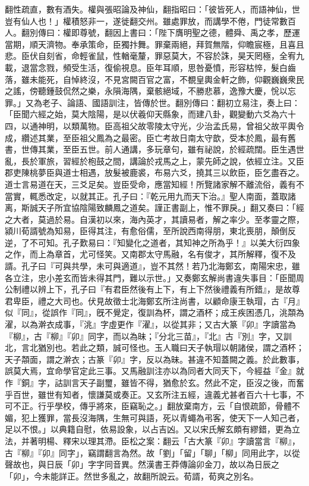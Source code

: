 \begin{pinyinscope}
翻性疏直，數有酒失。權與張昭論及神仙，翻指昭曰：「彼皆死人，而語神仙，世豈有仙人也！」權積怒非一，遂徙翻交州。雖處罪放，而講學不倦，門徒常數百人。翻別傳曰：權即尊號，翻因上書曰：「陛下膺明聖之德，體舜、禹之孝，歷運當期，順天濟物。奉承策命，臣獨抃舞。罪棄兩絕，拜賀無階，仰瞻宸極，且喜且悲。臣伏自刻省，命輕雀鼠，性輶毫釐，罪惡莫大，不容於誅，昊天罔極，全宥九載，退當念戮，頻受生活，復偷視息。臣年耳順，思咎憂憤，形容枯悴，髮白齒落，雖未能死，自悼終沒，不見宮闕百官之富，不覩皇輿金軒之飾，仰觀巍巍衆民之謠，傍聽鍾鼓侃然之樂，永隕海隅，棄骸絕域，不勝悲慕，逸豫大慶，恱以忘罪。」又為老子、論語、國語訓注，皆傳於世。翻別傳曰：翻初立易注，奏上曰：「臣聞六經之始，莫大陰陽，是以伏羲仰天縣象，而建八卦，觀變動六爻為六十四，以通神明，以類萬物。臣高祖父故零陵太守光，少治孟氏易，曾祖父故平輿令成，纘述其業，至臣祖父鳳為之最密。臣亡考故日南太守歆，受本於鳳，最有舊書，世傳其業，至臣五世。前人通講，多玩章句，雖有祕說，於經疏闊。臣生遇世亂，長於軍旅，習經於枹鼓之間，講論於戎馬之上，蒙先師之說，依經立注。又臣郡吏陳桃夢臣與道士相遇，放髮被鹿裘，布易六爻，撓其三以飲臣，臣乞盡吞之。道士言易道在天，三爻足矣。豈臣受命，應當知經！所覽諸家解不離流俗，義有不當實，輒悉改定，以就其正。孔子曰：『乾元用九而天下治。』聖人南面，蓋取諸离，斯誠天子所宜協陰陽致麟鳳之道矣。謹正書副上，惟不罪戾。」翻又奏曰：「經之大者，莫過於易。自漢初以來，海內英才，其讀易者，解之率少。至孝靈之際，潁川荀諝號為知易，臣得其注，有愈俗儒，至所說西南得朋，東北喪朋，顛倒反逆，了不可知。孔子歎易曰：『知變化之道者，其知神之所為乎！』以美大衍四象之作，而上為章首，尤可怪笑。又南郡太守馬融，名有俊才，其所解釋，復不及諝。孔子曰『可與共學，未可與適道』，豈不其然！若乃北海鄭玄，南陽宋忠，雖各立注，忠小差玄而皆未得其門，難以示世。」又奏鄭玄解尚書違失事目：「臣聞周公制禮以辨上下，孔子曰『有君臣然後有上下，有上下然後禮義有所錯』，是故尊君卑臣，禮之大司也。伏見故徵士北海鄭玄所注尚書，以顧命康王執瑁，古『月』似『同』，從誤作『同』，旣不覺定，復訓為杯，謂之酒杯；成王疾困憑几，洮頮為濯，以為澣衣成事，『洮』字虛更作『濯』，以從其非；又古大篆『卯』字讀當為『柳』，古『柳』『卯』同字，而以為昧；『分北三苗』，『北』古『別』字，又訓北，言北猶別也。若此之類，誠可怪也。玉人職曰天子執瑁以朝諸侯，謂之酒杯；天子頮面，謂之澣衣；古篆『卯』字，反以為昧。甚違不知蓋闕之義。於此數事，誤莫大焉，宜命學官定此三事。又馬融訓注亦以為同者大同天下，今經益『金』就作『銅』字，詁訓言天子副璽，雖皆不得，猶愈於玄。然此不定，臣沒之後，而奮乎百世，雖世有知者，懷謙莫或奏正。又玄所注五經，違義尤甚者百六十七事，不可不正。行乎學校，傳乎將來，臣竊恥之。」翻放棄南方，云「自恨疏節，骨體不媚，犯上獲罪，當長沒海隅，生無可與語，死以青蠅為弔客，使天下一人知己者，足以不恨。」以典籍自慰，依易設象，以占吉凶。又以宋氏解玄頗有繆錯，更為立法，并著明楊、釋宋以理其滯。臣松之案：翻云「古大篆『卯』字讀當言『柳』，古『柳』『卯』同字」，竊謂翻言為然。故「劉」「留」「聊」「柳」同用此字，以從聲故也，與日辰「卯」字字同音異。然漢書王莽傳論卯金刀，故以為日辰之「卯」，今未能詳正。然世多亂之，故翻所說云。荀諝，荀爽之別名。


\end{pinyinscope}
